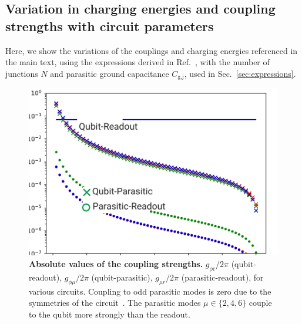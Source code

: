 \documentclass[%
reprint,
superscriptaddress,
 amsmath,amssymb,
 aps,
 prx,
longbibliography,
floatfix,
]{revtex4-2}
\begin{document}
\subsection{Variation in charging energies and coupling strengths with circuit parameters}\label{app:coupling}
Here, we show the variations of the couplings and charging energies referenced in the main text, using the expressions derived in Ref.~\cite{viola2015collective}, with the number of junctions $N$ and parasitic ground capacitance $C_\textrm{g,j}$, used in Sec.~\ref{sec:expressions}.\begin{figure}[tbh]
    \centering
    \includegraphics[width=\linewidth]{Supp_Fig/Coupling-strength.pdf}
    \caption{{\bf Absolute values of the coupling strengths.} $g_{\phi \textrm{r}}/2\pi$ (qubit-readout), $g_{\phi\mu}/2\pi$ (qubit-parasitic), $g_{\mu r}/2\pi$ (parasitic-readout), for various circuits. Coupling to odd parasitic modes is zero due to the symmetries of the circuit~\cite{viola2015collective}. The parasitic modes $\mu\in\{2,4,6\}$ couple to the qubit more strongly than the readout.}
    \label{fig:coupling-strength}
\end{figure}
\end{document}
